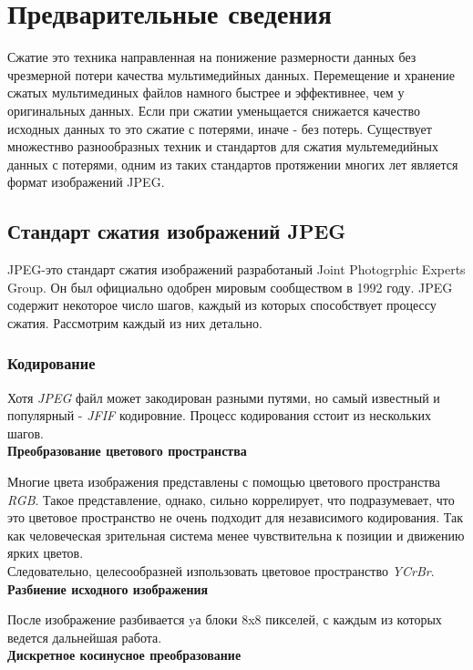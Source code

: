 \documentclass{matmex-diploma-custom}
\begin{document}
\section{Предварительные сведения}
Сжатие это техника направленная на понижение размерности данных без  чрезмерной потери качества мультимедийных данных.
Перемещение и хранение сжатых мультимединых  файлов намного быстрее  и эффективнее, чем у оригинальных данных. Если при сжатии уменьщается снижается качество исходных данных то это сжатие с потерями, иначе - без потерь. Существует множестнво разнообразных  техник и стандартов для сжатия мультемедийных данных с потерями, одним из таких стандартов протяжении многих лет является формат изображений JPEG.
\subsection{Стандарт сжатия изображений JPEG}
JPEG-это стандарт сжатия изображений разработаный Joint Photogrphic Experts Group. Он был официально одобрен мировым сообществом в 1992 году. JPEG содержит некоторое число шагов, каждый из которых способствует процессу сжатия.
Рассмотрим каждый из них детально.
\subsubsection{Кодирование}
Хотя \emph{JPEG} файл может закодирован разными путями, но самый известный и популярный - \emph{JFIF} кодировние.
Процесс кодирования сстоит из нескольких шагов.\\

\textbf{Преобразование цветового пространства} \newline

Многие цвета изображения представлены с помощью цветового пространства \emph{RGB}. Такое представление, однако, сильно коррелирует, что подразумевает, что это цветовое пространство не очень подходит для независимого кодирования. Так как человеческая зрительная система менее чувствительна к позиции и движению ярких  цветов. \\
Следовательно, целесообразней изпользовать цветовое пространство \emph{YCrBr}.\\

\textbf{Разбиение исходного изображения}\newline

После изображение разбивается yа блоки 8x8 пикселей, с каждым из которых ведется дальнейшая работа.\\

\textbf{Дискретное косинусное преобразование}\newline
\end{document}
